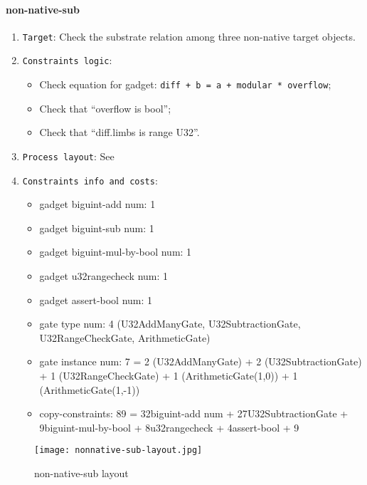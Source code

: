 \paragraph{non-native-sub}

\begin{enumerate}
    \item \verb|Target|: Check the substrate relation among three non-native target objects.
    \item \verb|Constraints logic|:
    \begin{itemize}
        \item Check equation for gadget: \verb|diff + b = a + modular * overflow|;
        \item Check that ``overflow is bool'';
        \item Check that ``diff.limbs is range U32''.
    \end{itemize}
    \item \verb|Process layout|: See 
    \item \verb|Constraints info and costs|:
    \begin{itemize}
        \item gadget biguint-add num: 1
        \item gadget biguint-sub num: 1
        \item gadget biguint-mul-by-bool num: 1
        \item gadget u32rangecheck num: 1
        \item gadget assert-bool num: 1
        \item gate type num: 4 (U32AddManyGate, U32SubtractionGate, U32RangeCheckGate, ArithmeticGate)
        \item gate instance num: 7 = 2 (U32AddManyGate) + 2 (U32SubtractionGate) + 1 (U32RangeCheckGate) + 1 (ArithmeticGate(1,0)) + 1 (ArithmeticGate(1,-1))
        \item copy-constraints: 89 = 32{biguint-add num} + 27{U32SubtractionGate} + 9{biguint-mul-by-bool} + 8{u32rangecheck} + 4{assert-bool} + 9
    \end{itemize}
\end{enumerate}

\begin{figure}[!ht]
    \centering
    \texttt{[image: nonnative-sub-layout.jpg]}
    \caption{non-native-sub layout}
    \label{fig:non-native-sub-layout}
\end{figure}